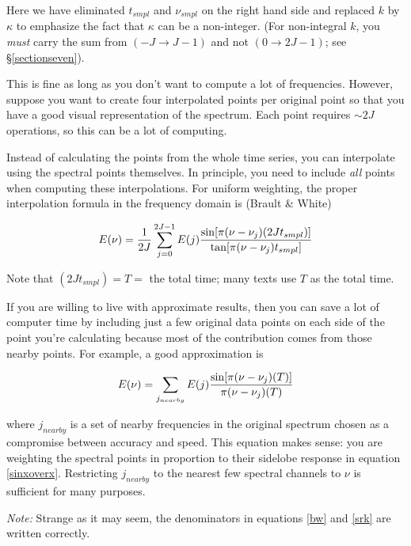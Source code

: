\documentclass[11pt,preprint]{aastex}
\begin{document}
\noindent Here we have eliminated $t_{smpl}$ and $\nu_{smpl}$ on the
right hand side and replaced $k$ by $\kappa$ to emphasize the fact that
$\kappa$ can be a non-integer. (For non-integral $k$, you {\it must}
carry the sum from $(-J \rightarrow J-1)$ and not $(0 \rightarrow
2J-1)$; see \S \ref{sectionseven}). 

	This is fine as long as you don't want to compute a lot of
frequencies. However, suppose you want to create four interpolated
points per original point so that you have a good visual representation
of the spectrum. Each point requires $\sim 2J$ operations, so this can
be a lot of computing.

	Instead of calculating the points from the whole time series,
you can interpolate using the spectral points themselves. In principle,
you need to include {\it all} points when computing these
interpolations.  For uniform weighting, the proper interpolation formula
in the frequency domain is (Brault \& White)

\begin{equation} \label{bw}
E(\nu) = {1 \over 2J} \sum_{j=0}^{2J-1} E(j) 
  { \sin[ \pi (\nu - \nu_j) (2Jt_{smpl})] \over
    \tan[ \pi (\nu - \nu_j) t_{smpl} ] }
\end{equation}

\noindent Note that $(2Jt_{smpl}) = T =$ the total time; many texts use
$T$ as the total time.

	If you are willing to live with approximate results, then you
can save a lot of computer time by including just a few original data
points on each side of the point you're calculating because most of the
contribution comes from those nearby points. For example, a good
approximation is 

\begin{equation} \label{srk}
E(\nu) = \sum_{j_{nearby}} E(j) 
  { \sin[ \pi (\nu - \nu_j) (T) ] \over
     \pi (\nu - \nu_j) (T)  }
\end{equation}

\noindent where $j_{nearby}$ is a set of nearby frequencies in the
original spectrum chosen as a compromise between accuracy and speed.
This equation makes sense: you are weighting the spectral points in
proportion to their sidelobe response in equation \ref{sinxoverx}. 
Restricting $j_{nearby}$ to the nearest few spectral channels to $\nu$
is sufficient for many purposes. 

	{\it Note:} Strange as it may seem, the denominators in
equations \ref{bw} and \ref{srk} are written correctly.
\end{document}
